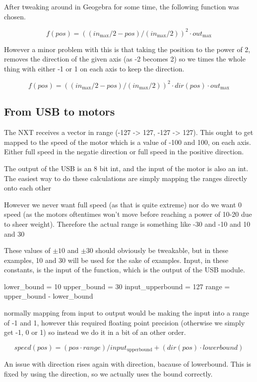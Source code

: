 After tweaking around in Geogebra for some time, the following function was chosen.

$$
f(pos) = ((in_\text{max}/2 - pos)/(in_\text{max}/2))^2 \cdot out_\text{max}
$$

However a minor problem with this is that taking the position to the power of 2, removes the direction of the given axis (as -2 becomes 2)
so we times the whole thing with either -1 or 1 on each axis to keep the direction.

$$
f(pos) = ((in_\text{max}/2 - pos)/(in_\text{max}/2))^2 \cdot dir(pos) \cdot out_\text{max}
$$

\subsection{From USB to motors}
The NXT receives a vector in range (-127 -> 127, -127 -> 127).
This ought to get mapped to the speed of the motor which is a value of -100 and 100, on each axis.
Either full speed in the negatie direction or full speed in the positive direction.


The output of the USB is an 8 bit int, and the input of the motor is also an int.
The easiest way to do these calculations are simply mapping the ranges directly onto each other

However we never want full speed (as that is quite extreme) nor do we want 0 speed (as the motors oftentimes won't move before reaching a power of 10-20 due to sheer weight).
Therefore the actual range is something like -30 and -10 and 10 and 30

These values of $\pm10$ and $\pm30$ should obviously be tweakable, but in these examples, 10 and 30 will be used for the sake of examples. 
Input, in these constants, is the input of the function, which is the output of the USB module.

	lower\_bound = 10
	upper\_bound = 30
	input\_upperbound = 127
	range = upper\_bound - lower\_bound

normally mapping from input to output would be making the input into a range of -1 and 1, however this required floating point precision (otherwise we simply get -1, 0 or 1) so instead we do it in a bit of an other order.

$$
speed(pos) = (pos \cdot range)/input_\text{upperbound} + (dir(pos) \cdot lowerbound)
$$

An issue with direction rises again with direction, bacause of lowerbound.
This is fixed by using the direction, so we actually uses the bound correctly.